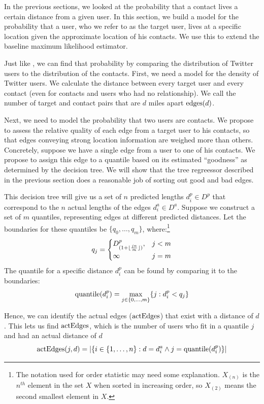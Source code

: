 In the previous sections, we looked at the probability that a contact lives a
certain distance from a given user.
%
In this section, we build a model for the probability that a user, who we refer
to as the target user, lives at a specific location given the approximate
location of his contacts.
%
We use this to extend the baseline maximum likelihood estimator.


Just like \cite{backstrom2010find}, we can find that probability by comparing
the distribution of Twitter users to the distribution of the contacts.
%
First, we need a model for the density of Twitter users.
%
We calculate the distance between every target user and every contact
(even for contacts and users who had no relationship).
%
We call the number of target and contact pairs that are $d$ miles apart
$\operatorname{edges}(d)$.

Next, we need to model the probability that two users are contacts.
%
We propose to assess the relative quality of each edge from a target
user to his contacts, so that edges conveying strong location information are
weighed more than others.
%
Concretely, suppose we have a single edge from a user to one of his contacts.
%
We propose to assign this edge to a quantile based on its estimated
``goodness'' as determined by the decision tree.
%
We will show that the tree regreessor described in the previous section does a
reasonable job of sorting out good and bad edges.

This decision tree will give us a set of $n$ predicted lengths $d^p_i \in D^p$
that correspond to the $n$ actual lengths of the edges $d^a_i \in D^a$.
%
Suppose we construct a set of $m$ quantiles, representing edges at different
predicted distances.
%
Let the boundaries for these quantiles be $\{q_0,\dots,q_m\}$,
where:\footnote{The notation used for order statistic may need some
    explanation.  $X_{(n)}$ is the $n^{th}$ element in the set $X$ when sorted
    in increasing order, so $X_{(2)}$ means the second smallest element in
$X$.}
\[
    q_j =
    \begin{cases}
        D^p_{(1+\lfloor {jn\over m} \rfloor)}, & j<m \\
        \infty & j=m
    \end{cases}
\]
\noindent The quantile for a specific distance $d^p_i$ can be found by
comparing it to the boundaries:
\[
    \operatorname{quantile}(d^p_i) = \max_{j \in \{0,\dots,m\}} \{j: d^p_i<q_j\}
\]

Hence, we can identify the actual edges ($\operatorname{actEdges}$) that exist with a distance of $d$.
%
This lets us find $\operatorname{actEdges}$, which is the number of users who fit in a quantile $j$ and had an actual distance of $d$
\[
    \operatorname{actEdges}(j,d) = |\{
            i \in \{1,\dots,n\} :
            d=d^a_i \wedge j=\operatorname{quantile}(d^p_i)
        \}|
\]

